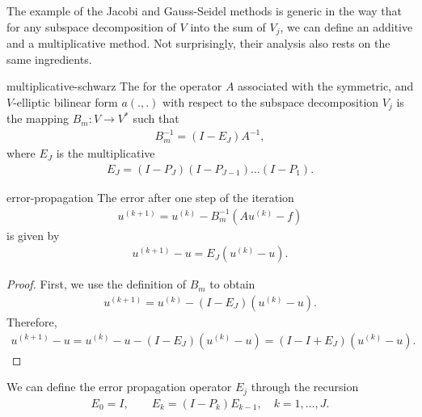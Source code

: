 \begin{intro}
  The example of the Jacobi and Gauss-Seidel methods is generic in the
  way that for any subspace decomposition of $V$ into the sum of
  $V_j$, we can define an additive and a multiplicative method. Not
  surprisingly, their analysis also rests on the same ingredients.
\end{intro}

\begin{Definition}{multiplicative-schwarz}
  The  for the operator
  $A$ associated with the symmetric, and $V$-elliptic bilinear form
  $a(.,.)$ with respect to the subspace decomposition $V_j$ is the
  mapping $B_m: V \to V^*$ such that
  \begin{gather}
    \label{eq:schwarz:34}
    B_m^{-1} = (I -  E_J) A^{-1},
  \end{gather}
  where $E_J$ is the multiplicative 
  \begin{gather}
    \label{eq:schwarz:35}
    E_J = (I - P_J)(I - P_{J-1})\dots(I - P_1).
  \end{gather}
\end{Definition}

\begin{Lemma}{error-propagation}
  The error after one step of the iteration
  \begin{gather*}
    u^{(k+1)} = u^{(k)} - B_m^{-1}\left(A u^{(k)} - f\right)
  \end{gather*}
  is given by
  \begin{gather*}
    u^{(k+1)} - u = E_J \left(u^{(k)} - u\right).
  \end{gather*}
\end{Lemma}

\begin{proof}
  First, we use the definition of $B_m$ to obtain
  \begin{gather*}
    u^{(k+1)} = u^{(k)} - (I -  E_J) \left(u^{(k)} - u\right).
  \end{gather*}
  Therefore,
  \begin{gather*}
    u^{(k+1)} - u = u^{(k)} - u - (I -  E_J) \left(u^{(k)} - u\right)
    = (I-I+E_J) \left(u^{(k)} - u\right).
  \end{gather*}  
\end{proof}

\begin{remark}
  We can define the error propagation operator $E_j$ through the
  recursion
  \begin{gather}
    \label{eq:schwarz:45}
    E_{0} = I, \qquad E_{k} = (I - P_k) E_{k-1}, \quad k=1,\dots,J.
  \end{gather}
\end{remark}

